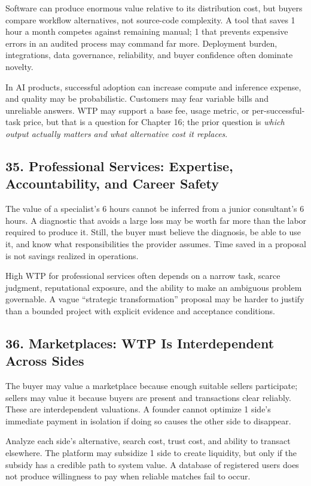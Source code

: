 Software can produce enormous value relative to its distribution cost, but buyers compare workflow alternatives, not source-code complexity. A tool that saves 1 hour a month competes against remaining manual; 1 that prevents expensive errors in an audited process may command far more. Deployment burden, integrations, data governance, reliability, and buyer confidence often dominate novelty.

In AI products, successful adoption can increase compute and inference expense, and quality may be probabilistic. Customers may fear variable bills and unreliable answers. WTP may support a base fee, usage metric, or per-successful-task price, but that is a question for Chapter 16; the prior question is \emph{which output actually matters and what alternative cost it replaces}.

\subsection*{35. Professional Services: Expertise, Accountability, and Career Safety}

The value of a specialist's 6 hours cannot be inferred from a junior consultant's 6 hours. A diagnostic that avoids a large loss may be worth far more than the labor required to produce it. Still, the buyer must believe the diagnosis, be able to use it, and know what responsibilities the provider assumes. Time saved in a proposal is not savings realized in operations.

High WTP for professional services often depends on a narrow task, scarce judgment, reputational exposure, and the ability to make an ambiguous problem governable. A vague ``strategic transformation'' proposal may be harder to justify than a bounded project with explicit evidence and acceptance conditions.

\subsection*{36. Marketplaces: WTP Is Interdependent Across Sides}

The buyer may value a marketplace because enough suitable sellers participate; sellers may value it because buyers are present and transactions clear reliably. These are interdependent valuations. A founder cannot optimize 1 side's immediate payment in isolation if doing so causes the other side to disappear.

Analyze each side's alternative, search cost, trust cost, and ability to transact elsewhere. The platform may subsidize 1 side to create liquidity, but only if the subsidy has a credible path to system value. A database of registered users does not produce willingness to pay when reliable matches fail to occur.

